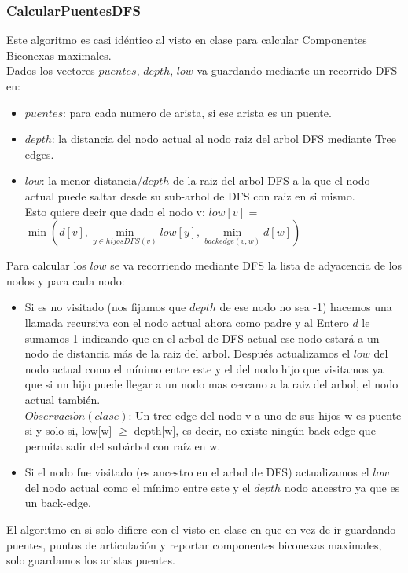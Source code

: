 \subsubsection*{CalcularPuentesDFS}

Este algoritmo es casi idéntico al visto en clase para calcular Componentes Biconexas maximales. \\

Dados los vectores $puentes$, $depth$, $low$ va guardando mediante un recorrido DFS en:
\begin{itemize}
	\item $puentes$: para cada numero de arista, si ese arista es un puente.
	\item $depth$: la distancia del nodo actual al nodo raiz del arbol DFS mediante Tree edges.
	\item $low$: la menor distancia/$depth$ de la raiz del arbol DFS a la que el nodo actual puede saltar
	desde su sub-arbol de DFS con raiz en si mismo. \\
	Esto quiere decir que dado el nodo v: $low[v]$ = $\min(d[v], \min\limits_{y \in hijosDFS(v)} low[y], \min\limits_{backedge(v,w)} d[w])$
\end{itemize}

Para calcular los $low$ se va recorriendo mediante DFS la lista de adyacencia de los nodos y para cada nodo:
\begin{itemize}
	\item Si es no visitado (nos fijamos que $depth$ de ese nodo no sea -1) hacemos una llamada recursiva con el nodo
	actual ahora como padre y al Entero $d$ le sumamos 1 indicando que en el arbol de DFS actual ese nodo
	estará a un nodo de distancia más de la raiz del arbol. Después actualizamos el $low$ del nodo actual
	como el mínimo entre este y el del nodo hijo que visitamos ya que si un hijo puede llegar a un nodo
	mas cercano a la raiz del arbol, el nodo actual también. \\
	$Observaci\acute{o}n (clase)$: Un tree-edge del nodo v a uno de sus hijos w es puente si y solo si, low[w] $\ge$ depth[w], es decir, 
	no existe ning\'un back-edge que permita salir del sub\'arbol con ra\'iz en w.
	\item Si el nodo fue visitado (es ancestro en el arbol de DFS) actualizamos el $low$ del nodo actual
	como el mínimo entre este y el $depth$ nodo ancestro ya que es un back-edge.
\end{itemize}

El algoritmo en si solo difiere con el visto en clase en que en vez de ir guardando puentes, puntos de 
articulación y reportar componentes biconexas maximales, solo guardamos los aristas puentes. \\

